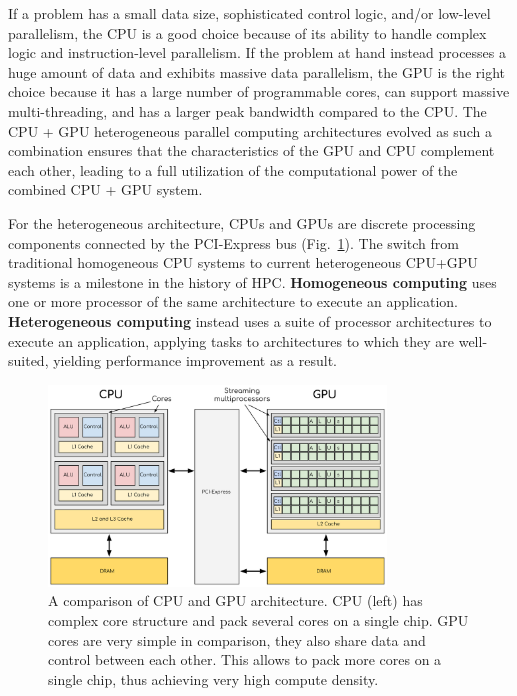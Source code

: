 \par
If a problem has a small data size, sophisticated control logic, and/or low-level parallelism, the CPU is a good choice because of its ability to handle complex logic and instruction-level parallelism.
If the problem at hand instead processes a huge amount of data and exhibits massive data parallelism, the GPU is the right choice because it has a large number of programmable cores, can support massive multi-threading, and has a larger peak bandwidth compared to the CPU.
The CPU + GPU heterogeneous parallel computing architectures evolved as such a combination ensures that the characteristics of the GPU and CPU complement each other, leading to a full utilization of the computational power of the combined CPU + GPU system.


\par
For the heterogeneous architecture, CPUs and GPUs are discrete processing components connected by the PCI-Express bus (Fig.~\ref{fig:cpu_gpu_architecture}).
The switch from traditional homogeneous CPU systems to current heterogeneous CPU+GPU systems is a milestone in the history of HPC.
\textbf{Homogeneous computing} uses one or more processor of the same architecture to execute an application.
\textbf{Heterogeneous computing} instead uses a suite of processor architectures to execute an application, applying tasks to architectures to which they are well-suited, yielding performance improvement as a result.


\begin{figure}[htbp]
\centering\includegraphics[width=0.8\textwidth]{fig_hardware/cpu_gpu_architecture.png}
\caption{A comparison of CPU and GPU architecture. CPU (left) has complex core structure and pack several cores on a single chip. GPU cores are very simple in comparison, they also share data and control between each other. This allows to pack more cores on a single chip, thus achieving very high compute density.}\label{fig:cpu_gpu_architecture}
\end{figure}



